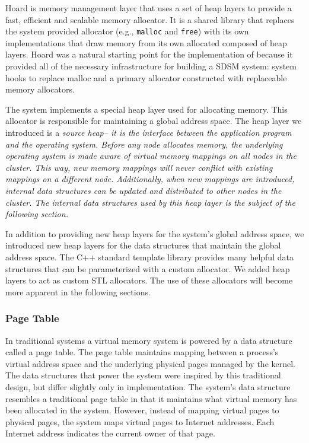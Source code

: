Hoard is memory management layer that uses a set of heap layers to provide a fast, efficient and scalable memory allocator.  It is a shared library that replaces the system provided allocator (e.g., \verb,malloc, and \verb,free,) with its own implementations that draw memory from its own allocated composed of heap layers.  Hoard was a natural starting point for the implementation of \projname{} because it provided all of the necessary infrastructure for building a SDSM system: system hooks to replace malloc and a primary allocator constructed with replaceable memory allocators.

The \projname{} system implements a special heap layer used for allocating memory.  This allocator is responsible for maintaining a global address space.  The heap layer we introduced is a \em source heap\em -- it is the interface between the application program and the operating system.  Before any node allocates memory, the underlying operating system is made aware of virtual memory mappings on all nodes in the cluster.  This way, new memory mappings will never conflict with existing mappings on a different node.  Additionally, when new mappings are introduced, internal data structures can be updated and distributed to other nodes in the cluster.  The internal data structures used by this heap layer is the subject of the following section.

In addition to providing new heap layers for the \projname{} system's global address space, we introduced new heap layers for the data structures that maintain the global address space.  The C++ standard template library provides many helpful data structures that can be parameterized with a custom allocator.  We added heap layers to act as custom STL allocators.  The use of these allocators will become more apparent in the following sections.

\subsubsection{Page Table}
In traditional systems a virtual memory system is powered by a data structure called a page table.  The page table maintains mapping between a process's virtual address space and the underlying physical pages managed by the kernel.  The data structures that power the \projname{} system were inspired by this traditional design, but differ slightly only in implementation.  The \projname{} system's data structure resembles a traditional page table in that it maintains what virtual memory has been allocated in the system.  However, instead of mapping virtual pages to physical pages, the system maps virtual pages to Internet addresses.  Each Internet address indicates the current owner of that page.

